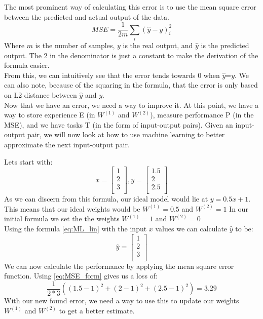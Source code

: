 The most prominent way of calculating this error is to use the mean square error between the predicted and actual output of the data. 
\begin{equation}\label{eq:MSE_form}
     MSE=\frac{1}{2m} \sum_i (\hat{y}-y)_i^2
\end{equation}
Where $m$ is the number of samples, $y$ is the real output, and $\hat{y}$ is the predicted output. The 2 in the denominator is just a constant to make the derivation of the formula easier.\\
From this, we can intuitively see that the error tends towards 0 when $\hat{y}$=$y$. We can also note, because of the squaring in the formula, that the error is only based on L2 distance between $\hat{y}$ and $y$.\\
Now that we have an error, we need a way to improve it.
At this point, we have a way to store experience E (in  $W^{(1)}$ and $W^{(2)}$), measure performance P (in the MSE), and we have tasks T (in the form of input-output pairs).
Given an input-output pair, we will now look at how to use machine learning to better approximate the next input-output pair.

\vspace{5px}
Lets start with: 
\begin{equation}
    x=\left[ \begin{array}{c} 1\\ 2\\ 3\\ \end{array} \right],
    y=\left[\begin{array}{c} 1.5\\2\\ 2.5\\\end{array}\right]
\end{equation}
As we can discern from this formula, our ideal model would lie at $y=0.5x + 1$. This means that our ideal weights would be  $W^{(1)}=0.5$ and $W^{(2)}=1$
In our initial formula we set the the weights $W^{(1)}=1$ and $W^{(2)}=0$\\
Using the formula \ref{eq:ML_lin} with the input $x$ values we can calculate  $\hat{y}$ to be:
\begin{equation}
    \hat{y}=\left[\begin{array}{c} 1\\ 2\\ 3\\ \end{array}\right]
\end{equation}
We can now calculate the performance by applying the mean square error function. Using \ref{eq:MSE_form} gives us a loss of:
\begin{equation}
   \frac{1}{2*3} \left( {(1.5-1)}^2+{(2-1)}^2+{(2.5-1)}^2 \right) = 3.29
\end{equation}
With our new found error, we need a way to use this to update our weights $W^{(1)}$ and $W^{(2)}$ to get a better estimate. 
    

